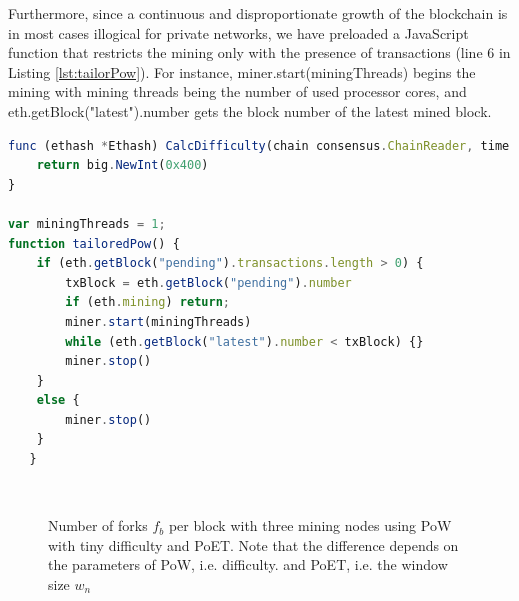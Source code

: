 Furthermore, since a continuous and disproportionate growth of the blockchain is in most cases illogical for private networks, we have preloaded a JavaScript function that restricts the mining only with the presence of transactions (line 6 in Listing \ref{lst:tailorPow}). For instance, miner.start(miningThreads) begins the mining with mining threads being the number of used processor cores, and eth.getBlock("latest").number gets the block number of the latest mined block.
\newline

\begin{lstlisting}[language=JavaScript,caption={Defined functions that specify the block difficulty and the tailored PoW.}, label={lst:tailorPow}]
func (ethash *Ethash) CalcDifficulty(chain consensus.ChainReader, time uint64, parent *types.Header) *big.Int {
    return big.NewInt(0x400)
}

var miningThreads = 1;
function tailoredPow() {
    if (eth.getBlock("pending").transactions.length > 0) {
        txBlock = eth.getBlock("pending").number
        if (eth.mining) return;
        miner.start(miningThreads)
        while (eth.getBlock("latest").number < txBlock) {}
        miner.stop()
    }
    else {
        miner.stop()
    }
   }
\end{lstlisting}

\begin{figure}[bth]
	\myfloatalign
	 \quad
	 \\
	\caption{Number of forks $f_b$ per block with three mining nodes using PoW with tiny difficulty and PoET. Note that the difference depends on the parameters of PoW, i.e. difficulty. and PoET, i.e. the window size $w_n$}
	\label{fig:forks}
\end{figure}

